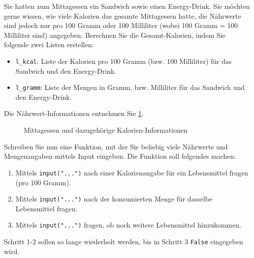 \begin{myexercise}
	Sie hatten zum Mittagessen ein Sandwich sowie einen Energy-Drink. Sie möchten gerne wissen, wie viele Kalorien das gesamte Mittagessen hatte, die Nährwerte sind jedoch nur pro 100 Gramm oder 100 Milliliter (wobei 100 Gramm = 100 Milliliter sind) angegeben. Berechnen Sie die Gesamt-Kalorien, indem Sie folgende zwei Listen erstellen:
	\begin{itemize}
		\item \lstinline|l_kcal|: Liste der Kalorien pro 100 Gramm (bzw. 100 Milliliter) für das Sandwich und den Energy-Drink.
		\item \lstinline|l_gramm|: Liste der Mengen in Gramm, bzw. Milliliter für das Sandwich und den Energy-Drink.
	\end{itemize}
	Die Nährwert-Informationen entnehmen Sie \cref{fig:lunch-kcal}.
	\begin{figure}[H]
		\centering
		
		\caption{Mittagessen und dazugehörige Kalorien-Informationen}
		\label{fig:lunch-kcal}
	\end{figure}

	\begin{myanswer}
		
	\end{myanswer}
\end{myexercise}

\begin{mychallenge}
	Schreiben Sie nun eine Funktion, mit der Sie beliebig viele Nährwerte und Mengenangaben mittels Input eingeben. Die Funktion soll folgendes machen:
	\begin{enumerate}
		\item Mittels \lstinline|input("...")| nach einer Kalorienangabe für ein Lebensmittel fragen (pro 100 Gramm).
		\item Mittels \lstinline|input("...")| nach der konsumierten Menge für dasselbe Lebensmittel fragen.
		\item Mittels \lstinline|input("...")| fragen, ob noch weitere Lebensmittel hinzukommen.
	\end{enumerate}

	Schritt 1-2 sollen so lange wiederholt werden, bis in Schritt 3  \lstinline|False| eingegeben wird.
	\begin{myanswer}
		
	\end{myanswer}

\end{mychallenge}

